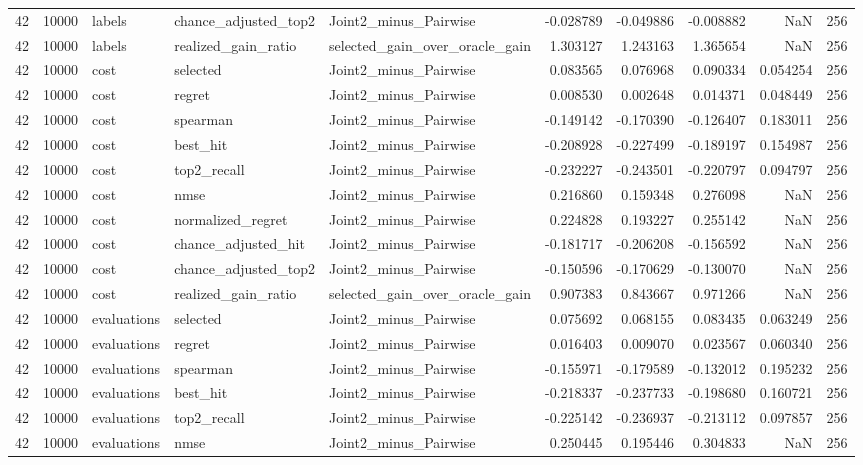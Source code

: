 \begin{tabular}{rrlllrrrrr}
42 & 10000 & labels & chance_adjusted_top2 & Joint2_minus_Pairwise & -0.028789 & -0.049886 & -0.008882 & NaN & 256 \\
42 & 10000 & labels & realized_gain_ratio & selected_gain_over_oracle_gain & 1.303127 & 1.243163 & 1.365654 & NaN & 256 \\
42 & 10000 & cost & selected & Joint2_minus_Pairwise & 0.083565 & 0.076968 & 0.090334 & 0.054254 & 256 \\
42 & 10000 & cost & regret & Joint2_minus_Pairwise & 0.008530 & 0.002648 & 0.014371 & 0.048449 & 256 \\
42 & 10000 & cost & spearman & Joint2_minus_Pairwise & -0.149142 & -0.170390 & -0.126407 & 0.183011 & 256 \\
42 & 10000 & cost & best_hit & Joint2_minus_Pairwise & -0.208928 & -0.227499 & -0.189197 & 0.154987 & 256 \\
42 & 10000 & cost & top2_recall & Joint2_minus_Pairwise & -0.232227 & -0.243501 & -0.220797 & 0.094797 & 256 \\
42 & 10000 & cost & nmse & Joint2_minus_Pairwise & 0.216860 & 0.159348 & 0.276098 & NaN & 256 \\
42 & 10000 & cost & normalized_regret & Joint2_minus_Pairwise & 0.224828 & 0.193227 & 0.255142 & NaN & 256 \\
42 & 10000 & cost & chance_adjusted_hit & Joint2_minus_Pairwise & -0.181717 & -0.206208 & -0.156592 & NaN & 256 \\
42 & 10000 & cost & chance_adjusted_top2 & Joint2_minus_Pairwise & -0.150596 & -0.170629 & -0.130070 & NaN & 256 \\
42 & 10000 & cost & realized_gain_ratio & selected_gain_over_oracle_gain & 0.907383 & 0.843667 & 0.971266 & NaN & 256 \\
42 & 10000 & evaluations & selected & Joint2_minus_Pairwise & 0.075692 & 0.068155 & 0.083435 & 0.063249 & 256 \\
42 & 10000 & evaluations & regret & Joint2_minus_Pairwise & 0.016403 & 0.009070 & 0.023567 & 0.060340 & 256 \\
42 & 10000 & evaluations & spearman & Joint2_minus_Pairwise & -0.155971 & -0.179589 & -0.132012 & 0.195232 & 256 \\
42 & 10000 & evaluations & best_hit & Joint2_minus_Pairwise & -0.218337 & -0.237733 & -0.198680 & 0.160721 & 256 \\
42 & 10000 & evaluations & top2_recall & Joint2_minus_Pairwise & -0.225142 & -0.236937 & -0.213112 & 0.097857 & 256 \\
42 & 10000 & evaluations & nmse & Joint2_minus_Pairwise & 0.250445 & 0.195446 & 0.304833 & NaN & 256 \\

\end{tabular}
